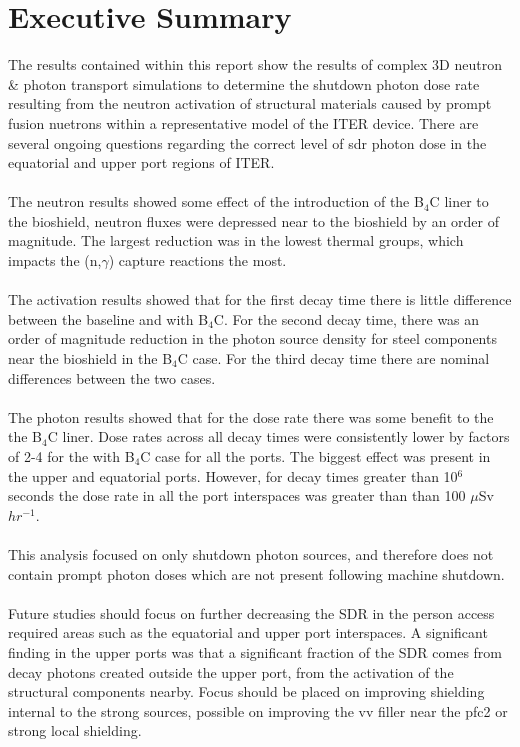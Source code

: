 \documentclass[12pt]{article}
\begin{document}
\glsresetall

\newpage
\section*{Executive Summary}
The results contained within this report show the results of complex 3D neutron
\& photon transport simulations to determine the shutdown photon dose rate
resulting from the neutron activation of structural materials caused by prompt
fusion nuetrons within a
representative model of the ITER device. There are several ongoing questions
regarding the correct level of \gls{sdr} photon dose in the equatorial and upper
port regions of ITER.
\\
\\
The neutron results showed some effect of the introduction of the B$_4$C liner 
to the bioshield, neutron fluxes were depressed near to the bioshield by an 
order of magnitude. The largest reduction was in the lowest thermal groups, 
which impacts the (n,$\gamma$) capture reactions the most.
\\
\\
The activation results showed that for the first decay time there is little 
difference between the baseline and with B$_4$C. For the second decay time, 
there was an order of magnitude reduction in the photon source density for 
steel components near the bioshield in the B$_4$C case. For the third decay
time there are nominal differences between the two cases.
\\
\\
The photon results showed that for the dose rate there was some benefit to the 
the B$_4$C liner. Dose rates across all decay times were consistently lower
by factors of 2-4 for the with B$_4$C case for all the ports. The biggest effect
was present in the upper and equatorial ports. However, for decay times greater
than 10$^6$ seconds the dose rate in all the port interspaces was greater than
than 100 $\mu$Sv $hr^{-1}$. 
\\
\\
This analysis focused on only shutdown photon sources, and therefore does not
contain prompt photon doses which are not present following machine shutdown.
\\
\\
Future studies should focus on further decreasing the SDR in the person 
access required areas such as the equatorial and upper port interspaces. A 
significant finding in the upper ports was that a significant fraction of the
SDR comes from decay photons created outside the upper port, from the activation
of the structural components nearby. Focus should be placed on improving 
shielding internal to the strong sources, possible on improving the \gls{vv} filler
near the \gls{pfc}2 or strong local shielding. 
\end{document}
